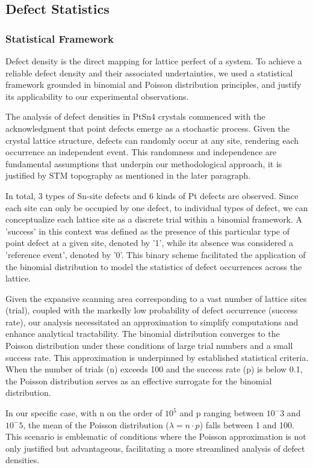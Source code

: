 \subsection{Defect Statistics}

\subsubsection{Statistical Framework}
Defect density is the direct mapping for lattice perfect of a system. To achieve a reliable defect density and their associated undertainties, we used a statistical framework grounded in binomial and Poisson distribution principles, and justify its applicability to our experimental observations.
\par The analysis of defect densities in PtSn4 crystals commenced with the acknowledgment that point defects emerge as a stochastic process. Given the crystal lattice structure, defects can randomly occur at any site, rendering each occurrence an independent event. This randomness and independence are fundamental assumptions that underpin our methodological approach, it is justified by STM topography as mentioned in the later paragraph.  
\par In total, 3 types of Sn-site defects and 6 kinds of Pt defects are observed. Since each site can only be occupied by one defect, to individual types of defect, we can conceptualize each lattice site as a discrete trial within a binomial framework. A 'success' in this context was defined as the presence of this particular type of point defect at a given site, denoted by '1', while its absence was considered a 'reference event', denoted by '0'. This binary scheme facilitated the application of the binomial distribution to model the statistics of defect occurrences across the lattice.
\par Given the expansive scanning area corresponding to a vast number of lattice sites (trial), coupled with the markedly low probability of defect occurrence (success rate), our analysis necessitated an approximation to simplify computations and enhance analytical tractability. The 
binomial distribution converges to the Poisson distribution under these conditions of large trial numbers and a small success rate. This approximation is underpinned by established statistical criteria. When the number of trials (n) exceeds 100 and the success rate (p) is below 0.1, the Poisson distribution serves as an effective surrogate for the binomial distribution. 
\par In our specific case, with n on the order of $10^5$ and p ranging between $10^-3$ and $10^-5$, the mean of the Poisson distribution ($\lambda=n\cdot p$) falls between 1 and 100. This scenario is emblematic of conditions where the Poisson approximation is not only justified but advantageous, facilitating a more streamlined analysis of defect densities.
